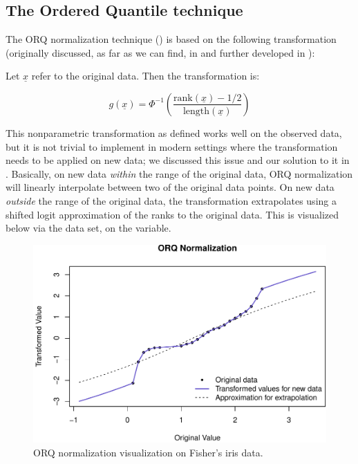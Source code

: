 \hypertarget{the-ordered-quantile-technique}{%
\subsection{The Ordered Quantile
technique}\label{the-ordered-quantile-technique}}

The ORQ normalization technique () is based on the
following transformation (originally discussed, as far as we can find,
in \citet{bartlett1947} and further developed in \citet{van1952}):

Let \(\underline x\) refer to the original data. Then the transformation
is:

\[
g(\underline x) = \Phi ^{-1} \left(\frac{\text{rank} (\underline x) - 1/2}{\text{length}(\underline x) }\right)
\]

This nonparametric transformation as defined works well on the observed
data, but it is not trivial to implement in modern settings where the
transformation needs to be applied on new data; we discussed this issue
and our solution to it in \citet{orq_paper}. Basically, on new data
\emph{within} the range of the original data, ORQ normalization will
linearly interpolate between two of the original data points. On new
data \emph{outside} the range of the original data, the transformation
extrapolates using a shifted logit approximation of the ranks to the
original data. This is visualized below via the  data set, on
the  variable.

\begin{Schunk}
\begin{figure}

{\centering \includegraphics[width=1\linewidth]{figs/orq_vis-1} 

}

\caption[ORQ normalization visualization on Fisher's iris data]{ORQ normalization visualization on Fisher's iris data.}\label{fig:orq_vis}
\end{figure}
\end{Schunk}

